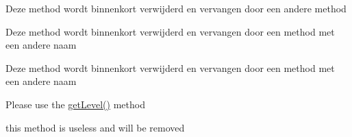 
\begin{DoxyRefList}
\item[Global \mbox{\hyperlink{classmohagames_1_1_plot_area_1_1utils_1_1_group_a51b2eb935c8a092010deb241ae364e32}{Group::get\+Group}} (\$group\+\_\+name)]\label{deprecated__deprecated000001}%
%
Deze method wordt binnenkort verwijderd en vervangen door een andere method  
\item[Global \mbox{\hyperlink{classmohagames_1_1_plot_area_1_1utils_1_1_group_a80ff7d4e6101b55bc46ce120b838b98d}{Group::get\+Group\+Id}} ()]\label{deprecated__deprecated000003}%
%
Deze method wordt binnenkort verwijderd en vervangen door een method met een andere naam  
\item[Global \mbox{\hyperlink{classmohagames_1_1_plot_area_1_1utils_1_1_group_abdfd06a2b3f8c7012f0f7b028444e4cc}{Group::save\+Group}} (\$group\+\_\+name, \mbox{\hyperlink{classmohagames_1_1_plot_area_1_1utils_1_1_plot}{Plot}} \$master\+\_\+plot, \mbox{\hyperlink{classmohagames_1_1_plot_area_1_1utils_1_1_plot}{Plot}} \$second\+\_\+plot)]\label{deprecated__deprecated000002}%
%
Deze method wordt binnenkort verwijderd en vervangen door een method met een andere naam  
\item[Global \mbox{\hyperlink{classmohagames_1_1_plot_area_1_1utils_1_1_plot_a5c1649570574f16801c868c91ccfc080}{Plot::get\+Level\+Name}} ()]\label{deprecated__deprecated000005}%
%
Please use the \mbox{\hyperlink{classmohagames_1_1_plot_area_1_1utils_1_1_plot_a23fac327059bf3fd0fe57555252d8cf2}{get\+Level()}} method  
\item[Global \mbox{\hyperlink{classmohagames_1_1_plot_area_1_1utils_1_1_plot_a5796dd3a45351aefee3d8f536b2a79ad}{Plot::get\+Plot}} ()]\label{deprecated__deprecated000004}%
%
this method is useless and will be removed
\end{DoxyRefList}